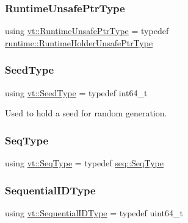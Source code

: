 \mbox{\label{namespacevt_a8019b70cc4b9b0833c38559c85dfd53b}} 
\subsubsection{\texorpdfstring{Runtime\+Unsafe\+Ptr\+Type}{RuntimeUnsafePtrType}}
{\footnotesize\ttfamily using \hyperlink{namespacevt_a8019b70cc4b9b0833c38559c85dfd53b}{vt\+::\+Runtime\+Unsafe\+Ptr\+Type} = typedef \hyperlink{namespacevt_1_1runtime_a69931905b04961a874e4a70a43083a83}{runtime\+::\+Runtime\+Holder\+Unsafe\+Ptr\+Type}}

\mbox{\label{namespacevt_ae2e13198bdef4d5b8e603d6c1c7f0969}} 
\subsubsection{\texorpdfstring{Seed\+Type}{SeedType}}
{\footnotesize\ttfamily using \hyperlink{namespacevt_ae2e13198bdef4d5b8e603d6c1c7f0969}{vt\+::\+Seed\+Type} = typedef int64\+\_\+t}



Used to hold a seed for random generation. 

\mbox{\label{namespacevt_a98ecd5e376bd317a21b245064361240e}} 
\subsubsection{\texorpdfstring{Seq\+Type}{SeqType}}
{\footnotesize\ttfamily using \hyperlink{namespacevt_a98ecd5e376bd317a21b245064361240e}{vt\+::\+Seq\+Type} = typedef \hyperlink{namespacevt_1_1seq_a3b612da217ac669d39c159f134ab8434}{seq\+::\+Seq\+Type}}

\mbox{\label{namespacevt_a3063d4db3b879d6dd2c7b8d50995c7f6}} 
\subsubsection{\texorpdfstring{Sequential\+I\+D\+Type}{SequentialIDType}}
{\footnotesize\ttfamily using \hyperlink{namespacevt_a3063d4db3b879d6dd2c7b8d50995c7f6}{vt\+::\+Sequential\+I\+D\+Type} = typedef uint64\+\_\+t}



